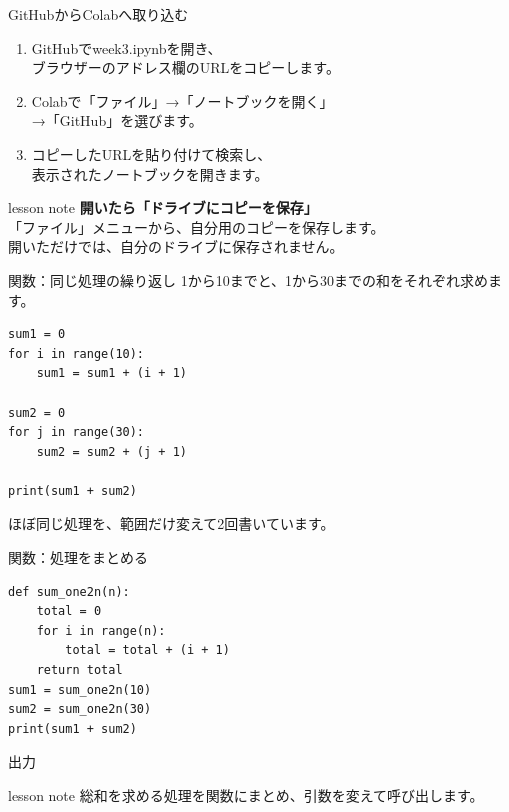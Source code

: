 \documentclass[12pt,aspectratio=43]{beamer}
\newcommand{\code}[1]{{\codefont #1}}
\newcommand{\result}[1]{%
  \par\vspace{1mm}%
  {\small\textcolor{black!60}{出力}}\quad
  {\codefont\fontsize{16}{18}\selectfont #1}\par}
\newenvironment{lessonbox}
  {\begin{beamercolorbox}[wd=\linewidth,sep=1.5mm]{lesson note}}
  {\end{beamercolorbox}\par}
\begin{document}
\begin{frame}[t]{GitHubからColabへ取り込む}
  \setlength{\parskip}{0pt}
  \begin{enumerate}
    \setlength{\itemsep}{4mm}
    \item GitHubで\code{week3.ipynb}を開き、\\
      ブラウザーのアドレス欄のURLをコピーします。
    \item Colabで「ファイル」→「ノートブックを開く」\\
      →「GitHub」を選びます。
    \item コピーしたURLを貼り付けて検索し、\\
      表示されたノートブックを開きます。
  \end{enumerate}
  \vspace{3mm}
  \begin{lessonbox}
    \textbf{開いたら「ドライブにコピーを保存」}\\[1mm]
    \small 「ファイル」メニューから、自分用のコピーを保存します。\\
    開いただけでは、自分のドライブに保存されません。
  \end{lessonbox}
\end{frame}

\begin{frame}[t,fragile]{関数：同じ処理の繰り返し}
  \setlength{\parskip}{0pt}
  1から10までと、1から30までの和をそれぞれ求めます。
\begin{lstlisting}
sum1 = 0
for i in range(10):
    sum1 = sum1 + (i + 1)

sum2 = 0
for j in range(30):
    sum2 = sum2 + (j + 1)

print(sum1 + sum2)
\end{lstlisting}
  {\small ほぼ同じ処理を、範囲だけ変えて2回書いています。}
\end{frame}

\begin{frame}[t,fragile]{関数：処理をまとめる}
  \setlength{\parskip}{0pt}
\begin{lstlisting}
def sum_one2n(n):
    total = 0
    for i in range(n):
        total = total + (i + 1)
    return total
sum1 = sum_one2n(10)
sum2 = sum_one2n(30)
print(sum1 + sum2)
\end{lstlisting}
  \result{520}
  \vspace{1mm}
  \begin{lessonbox}
    \small 総和を求める処理を関数にまとめ、引数を変えて呼び出します。
  \end{lessonbox}
\end{frame}
\end{document}
